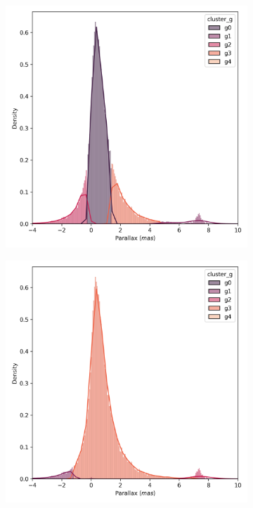 \documentclass[11pt,a4paper,english,twocolumn]{article}
\begin{document}
\begin{figure}[!hbt]
  \begin{subfigure}{0.3\textwidth}
    \includegraphics[width=\textwidth]{../figures/melotte_22/kmeans_parallax_melotte_22.png}
  \end{subfigure}
  \begin{subfigure}{0.3\textwidth}
    \includegraphics[width=\textwidth]{../figures/melotte_22/dec_parallax_melotte_22.png}

\end{subfigure}
\end{figure}
\end{document}
